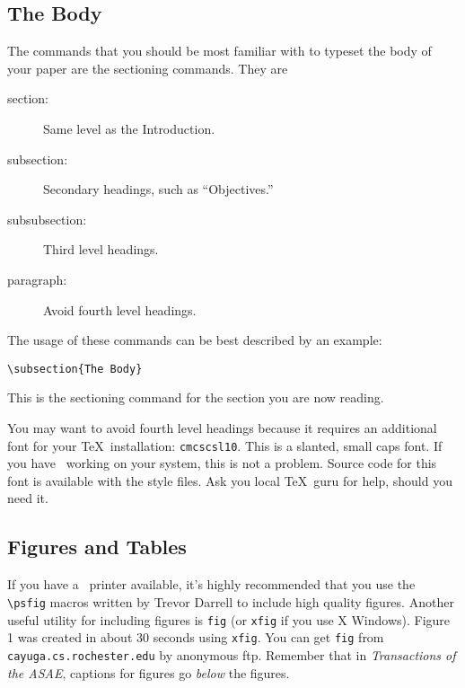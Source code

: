 \subsection{The Body}
The commands that you should be most familiar with to typeset the
body of your paper are the sectioning commands. They are
\begin{description}
\item[section:] Same  level as the Introduction.
\item[subsection:] Secondary headings, such as 
``Objectives.'' 
\item[subsubsection:] Third level headings.
\item[paragraph:] Avoid fourth level headings.
\end{description}
The usage of these commands can be best described by an example:
\begin{verbatim}
\subsection{The Body}
\end{verbatim}
This is the sectioning command for the section you are now reading.  

You may want to avoid fourth level headings because it requires an
additional font for your \TeX\ installation: {\tt cmcscsl10}.  This is
a slanted, small caps font. If you have \MF\ working on your system,
this is not a problem.  Source code for this font is available with
the style files. Ask you local \TeX\ guru for help, should you need
it.

\subsection{Figures and Tables}

If you have a \PS\ printer available, it's highly recommended that you
use the \verb# \psfig# macros written by Trevor Darrell to include
high quality figures. Another useful utility for including figures is
{\tt fig} (or {\tt xfig} if you use X Windows).  Figure 1 was created
in about 30 seconds using {\tt xfig}. You can get {\tt fig} from {\tt
cayuga.cs.rochester.edu} by anonymous ftp. Remember that in {\em
Transactions of the ASAE}, captions for figures go {\em below} the
figures.

